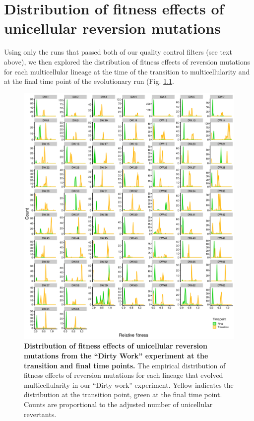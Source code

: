 \documentclass[
]{book}
\begin{document}
\hypertarget{distribution-of-fitness-effects-of-unicellular-reversion-mutations}{%
\chapter{Distribution of fitness effects of unicellular reversion mutations}\label{distribution-of-fitness-effects-of-unicellular-reversion-mutations}}

Using only the runs that passed both of our quality control filters (see text above), we then explored the distribution of fitness effects of reversion mutations for each multicellular lineage at the time of the transition to multicellularity and at the final time point of the evolutionary run (Fig. \ref{fig:dw-DFERMs}.

\begin{figure}
\centering
\includegraphics{images/Figure_S6_Relative_fitness_distributions_20DEC22.png}
\caption{\label{fig:dw-DFERMs}\textbf{Distribution of fitness effects of unicellular reversion mutations from the ``Dirty Work'' experiment at the transition and final time points.} The empirical distribution of fitness effects of reversion mutations for each lineage that evolved multicellularity in our ``Dirty work'' experiment. Yellow indicates the distribution at the transition point, green at the final time point. Counts are proportional to the adjusted number of unicellular revertants.}
\end{figure}
\end{document}
